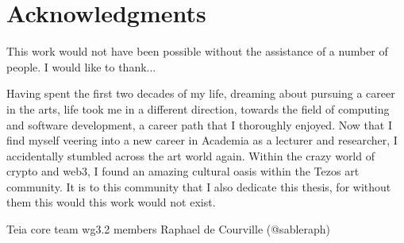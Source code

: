\chapter*{Acknowledgments}

This work would not have been possible without the assistance of a number of people. I would like to thank...


Having spent the first two decades of my life, dreaming about pursuing a career in the arts, life took me in a different direction, towards the field of computing and software development, a career path that I thoroughly enjoyed. Now that I find myself veering into a new career in Academia as a lecturer and researcher, I accidentally stumbled across the art world again. Within the crazy world of crypto and web3, I found an amazing cultural oasis within the Tezos art community. It is to this community that I also dedicate this thesis, for without them this would this work would not exist. 


Teia core team
wg3.2 members
Raphael de Courville (@sableraph)


